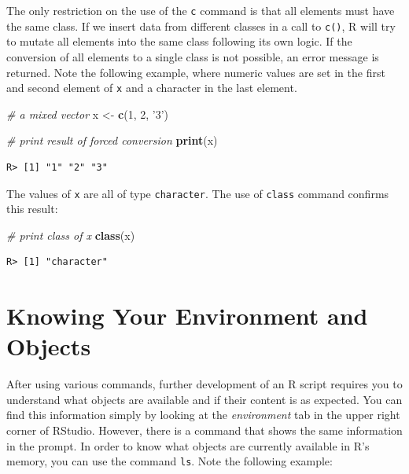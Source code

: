 \documentclass[
  12pt,
]{book}
\newenvironment{Shaded}{\begin{snugshade}}{\end{snugshade}}
\newcommand{\CommentTok}[1]{\textcolor[rgb]{0.37,0.37,0.37}{\textit{#1}}}
\newcommand{\DecValTok}[1]{\textcolor[rgb]{0.06,0.06,0.06}{#1}}
\newcommand{\KeywordTok}[1]{\textcolor[rgb]{0.27,0.27,0.27}{\textbf{#1}}}
\newcommand{\NormalTok}[1]{#1}
\newcommand{\StringTok}[1]{\textcolor[rgb]{0.5,0.5,0.5}{#1}}
\begin{document}
The only restriction on the use of the \texttt{c} command is that all elements must have the same class. If we insert data from different classes in a call to \texttt{c()}, R will try to mutate all elements into the same class following its own logic. If the conversion of all elements to a single class is not possible, an error message is returned. Note the following example, where numeric values are set in the first and second element of \texttt{x} and a character in the last element.

\begin{Shaded}
\begin{Highlighting}[]
\CommentTok{# a mixed vector}
\NormalTok{x <-}\StringTok{ }\KeywordTok{c}\NormalTok{(}\DecValTok{1}\NormalTok{, }\DecValTok{2}\NormalTok{, }\StringTok{'3'}\NormalTok{)}

\CommentTok{# print result of forced conversion}
\KeywordTok{print}\NormalTok{(x)}
\end{Highlighting}
\end{Shaded}

\begin{verbatim}
R> [1] "1" "2" "3"
\end{verbatim}

The values of \texttt{x} are all of type \texttt{character}. The use of \texttt{class} command confirms this result:

\begin{Shaded}
\begin{Highlighting}[]
\CommentTok{# print class of x}
\KeywordTok{class}\NormalTok{(x)}
\end{Highlighting}
\end{Shaded}

\begin{verbatim}
R> [1] "character"
\end{verbatim}

\hypertarget{knowing-your-environment-and-objects}{%
\section{Knowing Your Environment and Objects}\label{knowing-your-environment-and-objects}}

After using various commands, further development of an R script requires you to understand what objects are available and if their content is as expected. You can find this information simply by looking at the \emph{environment} tab in the upper right corner of RStudio. However, there is a command that shows the same information in the prompt. In order to know what objects are currently available in R's memory, you can use the command \texttt{ls}. Note the following example: 
\end{document}
